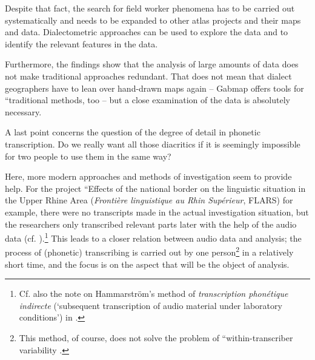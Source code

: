 \documentclass[output=paper]{LSP/langsci}
\begin{document}
Despite that fact, the search for field worker phenomena has to be carried out systematically and needs to be expanded to other atlas projects and their maps and data.  Dialectometric approaches can be used to explore the data and to identify the relevant features in the data.

Furthermore, the findings show that the analysis of large amounts of data does not make traditional approaches redundant. That does not mean that dialect geographers have to lean over hand-drawn maps again – Gabmap offers tools for ``traditional{\textquotedbl} methods, too – but a close examination of the data is absolutely necessary.

A last point concerns the question of the degree of detail in phonetic transcription. Do we really want all those diacritics if it is seemingly impossible for two people to use them in the same way?

Here, more modern approaches and methods of investigation seem to provide help. For the project ``Effects of the national border on the linguistic situation in the Upper Rhine Area{\textquotedbl} (\textit{Frontière linguistique au Rhin Supérieur}, FLARS) for example, there were no transcripts made in the actual investigation situation, but the researchers only transcribed relevant parts later with the help of the audio data (cf. \citealt{auer_auswirkungen_2015}).\footnote{Cf. also the note on Hammarström's method of \textit{transcription phonétique indirecte} (`subsequent transcription of audio material under laboratory conditions') in \citet[73]{hotzenkocherle_einfuhrung_1962}.} This leads to a closer relation between audio data and analysis; the process of (phonetic) transcribing is carried out by one person\footnote{This method, of course, does not solve the problem of ``within-transcriber variability{\textquotedbl} \citep[258]{kerswill_limits_1990}.} in a relatively short time, and the focus is on the aspect that will be the object of analysis.

\printbibliography[heading=subbibliography,notkeyword=this]
\end{document}
